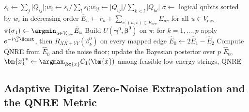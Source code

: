 \begin{algorithm}[htbp]
\caption{\deal\ with dynamic physical mapping.}\label{alg:deal}
$s_{i}\gets\sum_{j}\lvert Q_{ij}\rvert$;\quad $w_{i}\gets s_{i}/\sum_{l}s_{l}$;\quad $w_{ij}\gets \lvert Q_{ij}\rvert/\sum_{k<l}\lvert Q_{kl}\rvert$ 
$\sigma\gets$ logical qubits sorted by $w_{i}$ in decreasing order\;
$\bar{E}_{u}\gets r_{u}+\sum_{v:(u,v)\in E_{\mathrm{dev}}}E_{uv}$ for all $u\in V_{\mathrm{dev}}$ 
$\pi(\sigma_{1})\gets\argmin_{u\in V_{\mathrm{dev}}}\bar{E}_{u}$\;
Build $U(\bm{\gamma}^{0},\bm{\beta}^{0})$ on $\pi$: for $k=1,\dots,p$ apply $e^{-i\gamma_{k}^{0}\Hcost}$, then $R_{XX+YY}(\beta_{k}^{0})$ on every mapped edge\;
$\hat{E}_{0}\gets 2\hat{E}_{1}-\hat{E}_{2}$ 
Compute QNRE from $\hat{E}_{0}$ and the noise floor; update the Bayesian posterior over $p$\;
\Return $\hat{E}_{0}$, $\bm{x}^{\star}\gets\argmax_{\bm{x}}C_{1}(\bm{x})$ among feasible low-energy strings, QNRE\;
\end{algorithm}

\subsection{Adaptive Digital Zero-Noise Extrapolation and the QNRE Metric}\label{sec:nisq:zne}

